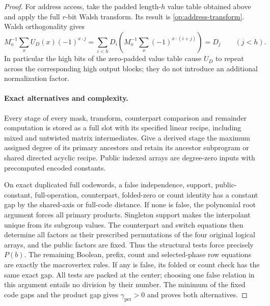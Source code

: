 \begin{proof}
For address access, take the padded length-$h$ value table obtained
above and apply the full $r$-bit Walsh transform.  Its result is
\eqref{op:address-transform}.  Walsh orthogonality gives
\[
 M_o^{-1}\sum_x U_D(x)(-1)^{x\cdot j}
 =\sum_{i<h}D_i
        \left(M_o^{-1}\sum_x(-1)^{x\cdot(i+j)}\right)
 =D_j \qquad(j<h).
\]
In particular the high bits of the zero-padded value table cause
$U_D$ to repeat across the corresponding high output blocks;
they do not introduce an additional normalization factor.

\paragraph{Exact alternatives and complexity.}
Every stage of every mask, transform, counterpart comparison and
remainder computation is stored as a full slot with its specified
linear recipe, including mixed and untwisted matrix intermediates.
Give a derived stage the maximum assigned degree of its primary
ancestors and retain its ancestor subprogram or shared directed
acyclic recipe.  Public indexed arrays are degree-zero inputs with
precomputed encoded constants.

On exact duplicated full codewords, a false independence, support,
public-constant, full-operation, counterpart, folded-zero or count
identity has a constant gap by the shared-axis or full-code distance.
If none is false, the polynomial root argument forces all primary
products.  Singleton support makes the interpolant unique from its
subgroup values.  The counterpart and switch equations then determine
all factors as their prescribed permutations of the four original
logical arrays, and the public factors are fixed.  Thus the structural
tests force precisely $P(b)$.  The remaining Boolean, prefix, count
and selected-phase row equations are exactly the macrovertex rules.
If any is false, its folded or count check has the same exact gap.
All tests are packed at the center; choosing one false relation in
this argument entails no division by their number.  The minimum of
the fixed code gaps and the product gap gives
$\gamma_{\mathrm{per}}>0$ and proves both alternatives.


\end{proof}
